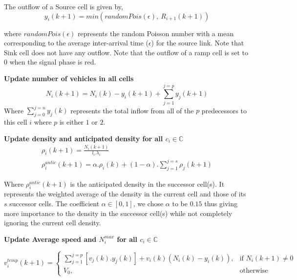 \documentclass[12pt]{article}
\begin{document}
The outflow of a Source cell is given by,
\begin{equation}
y_i(k+1)=min(randomPois(\epsilon),~R_{i+1}(k+1))
\end{equation}

where $randomPois(\epsilon)$ represents the random Poisson number with a mean corresponding to the average inter-arrival time ($\epsilon$) for the source link. Note that Sink cell does not have any outflow. Note that the outflow of a ramp cell is set to $0$ when the signal phase is red.

\textbf{Update number of vehicles in all cells}
\begin{equation}
N_i(k+1)=N_i(k)-y_i(k+1)+\sum\limits_{j=1}^{j=p}y_j(k+1)
\end{equation}
Where $\sum\limits_{j=0}^{j=n}y_j(k)$ represents the total inflow from all of the $p$ predecessors to this cell $i$ where $p$ is either $1$ or $2$.


\textbf{Update density and anticipated density for all $c_i\in \mathbb{C}$}
\begin{subequations}
 \label{eq:cell-density}
 \begin{eqnarray}
\rho_i(k+1)=\frac{N_i(k+1)}{l_i.\lambda_i}\\
\rho_i^{antic}(k+1)=\alpha.\rho_i(k)+(1-\alpha).\sum\limits_{j=1}^{j=s}\rho_j(k+1)
\end{eqnarray}
\end{subequations}

Where $\rho_i^{antic}(k+1)$ is the anticipated density in the successor cell(s). It represents the weighted average of the density in the current cell and those of its $s$ successor cells. The coefficient $\alpha\in[0,1]$, we chose $\alpha$ to be $0.15$ thus giving more importance to the density in the successor cell(s) while not completely ignoring the current cell density.


\textbf{Update Average speed and $N_{i}^{max}$ for all $c_i\in \mathbb{C}$}


 \begin{equation}
v_i^{temp}(k+1)=
\begin{cases}
\sum\limits_{j=1}^{j=p}[v_{j}(k).y_{j}(k)]+v_i(k)(N_i(k)-y_i(k)), & \text{if } N_i(k+1)\ne 0\\
V_0, & \text{otherwise}
\end{cases}
\end{equation}
\end{document}
